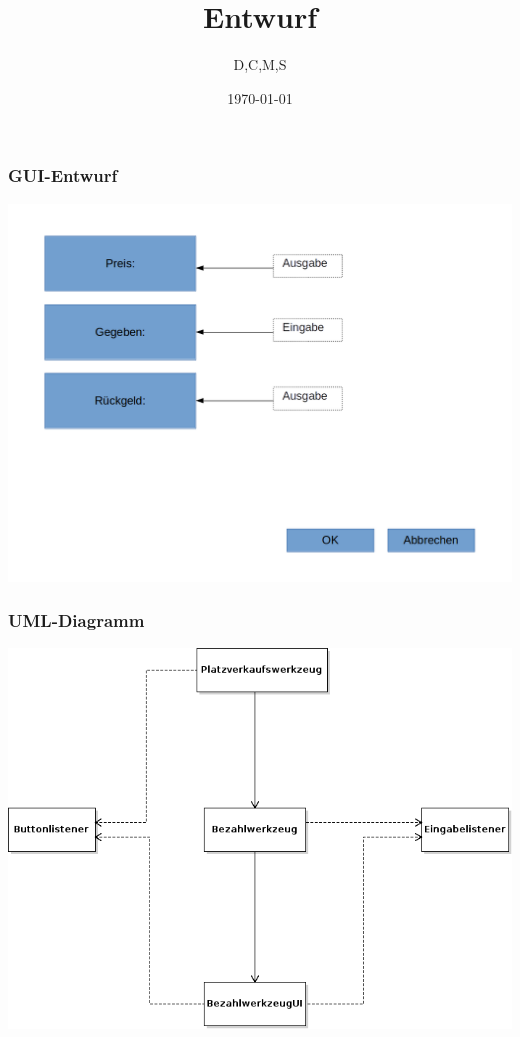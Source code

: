 \documentclass{beamer}
\author{D,C,M,S}
\title{Entwurf}
\date{\today}
\begin{document}

\begin{frame}
	\frametitle{GUI-Entwurf}
	\begin{center}
		\includegraphics[width=0.7\linewidth]{./Images/UI-Entwurf.png}
	\end{center}
\end{frame}

\begin{frame}
	\frametitle{UML-Diagramm}
	\begin{center}
		\includegraphics[width=0.7\linewidth]{./Images/UML.png}
	\end{center}
\end{frame}
\end{document}
